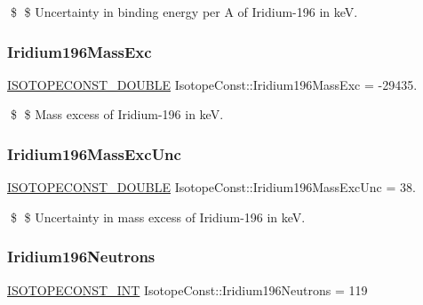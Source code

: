 \$ \$ Uncertainty in binding energy per A of Iridium-\/196 in keV. \mbox{\label{group___isotope_const-_iridium-_ir196_ga9903844f843527422af04729a468688c}} 
\subsubsection{\texorpdfstring{Iridium196\+Mass\+Exc}{Iridium196MassExc}}
{\footnotesize\ttfamily \mbox{\hyperlink{group___isotope_const-_macros_ga8f45a7272ce02c0b4c65c44636ed719a}{I\+S\+O\+T\+O\+P\+E\+C\+O\+N\+S\+T\+\_\+\+D\+O\+U\+B\+LE}} Isotope\+Const\+::\+Iridium196\+Mass\+Exc = -\/29435.}

\$ \$ Mass excess of Iridium-\/196 in keV. \mbox{\label{group___isotope_const-_iridium-_ir196_ga24c54c6c6e7bd4503121319dd372bba8}} 
\subsubsection{\texorpdfstring{Iridium196\+Mass\+Exc\+Unc}{Iridium196MassExcUnc}}
{\footnotesize\ttfamily \mbox{\hyperlink{group___isotope_const-_macros_ga8f45a7272ce02c0b4c65c44636ed719a}{I\+S\+O\+T\+O\+P\+E\+C\+O\+N\+S\+T\+\_\+\+D\+O\+U\+B\+LE}} Isotope\+Const\+::\+Iridium196\+Mass\+Exc\+Unc = 38.}

\$ \$ Uncertainty in mass excess of Iridium-\/196 in keV. \mbox{\label{group___isotope_const-_iridium-_ir196_gabce95a2c8401a70215888e587e6b3fd1}} 
\subsubsection{\texorpdfstring{Iridium196\+Neutrons}{Iridium196Neutrons}}
{\footnotesize\ttfamily \mbox{\hyperlink{group___isotope_const-_macros_ga5f18360b3e99483a35c32d789e62621c}{I\+S\+O\+T\+O\+P\+E\+C\+O\+N\+S\+T\+\_\+\+I\+NT}} Isotope\+Const\+::\+Iridium196\+Neutrons = 119}

